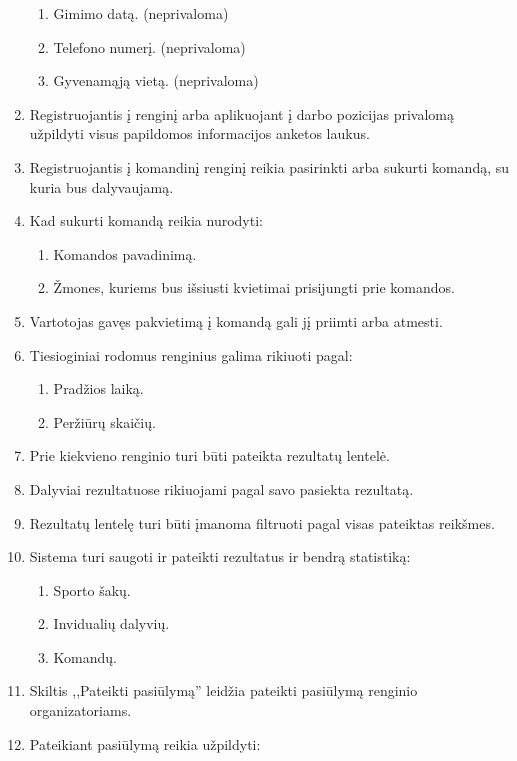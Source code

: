 \documentclass{VUMIFPSkursinis}
\begin{document}
\begin{enumerate}[label=\textbf{FR\arabic*}]
\begin{enumerate}[label*=\textbf{.\arabic*}]
						\item Gimimo datą. (neprivaloma)
						\item Telefono numerį. (neprivaloma)
						\item Gyvenamąją vietą. (neprivaloma)
					\end{enumerate}
				\item Registruojantis į renginį arba aplikuojant į darbo pozicijas privalomą užpildyti visus papildomos informacijos anketos laukus.
				\item Registruojantis į komandinį renginį reikia pasirinkti arba sukurti komandą, su kuria bus dalyvaujamą.
				\item Kad sukurti komandą reikia nurodyti:
					\begin{enumerate}[label*=\textbf{.\arabic*}]
						\item Komandos pavadinimą.
						\item Žmones, kuriems bus išsiusti kvietimai prisijungti prie komandos.
					\end{enumerate}
				\item Vartotojas gavęs pakvietimą į komandą gali jį priimti arba atmesti.
				\item Tiesioginiai rodomus renginius galima rikiuoti pagal:
					\begin{enumerate}[label*=\textbf{.\arabic*}]
						\item Pradžios laiką.
						\item Peržiūrų skaičių.
					\end{enumerate}
				\item Prie kiekvieno renginio turi būti pateikta rezultatų lentelė.
				\item Dalyviai rezultatuose rikiuojami pagal savo pasiekta rezultatą.
				\item Rezultatų lentelę turi būti įmanoma filtruoti pagal visas pateiktas reikšmes.
                \item Sistema turi saugoti ir pateikti rezultatus ir bendrą statistiką:
					\begin{enumerate}[label*=\textbf{.\arabic*}]
						\item Sporto šakų.
						\item Invidualių dalyvių.
						\item Komandų.
					\end{enumerate}
				\item Skiltis ,,Pateikti pasiūlymą'' leidžia pateikti pasiūlymą renginio organizatoriams.
				\item Pateikiant pasiūlymą reikia užpildyti:

\end{enumerate}
\end{document}
